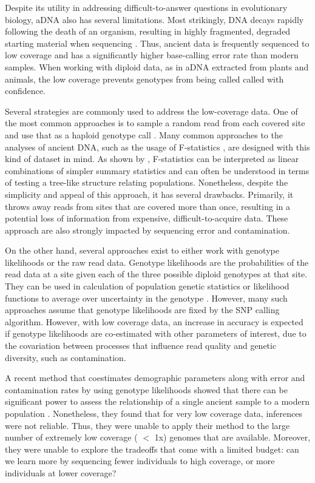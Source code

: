 \documentclass[11pt, oneside]{article}   	%
\begin{document}
Despite its utility in addressing difficult-to-answer questions in evolutionary biology, aDNA also has several limitations. Most strikingly, DNA decays rapidly following the death of an organism, resulting in highly fragmented, degraded starting material when sequencing \citep{sawyer2012temporal}. Thus, ancient data is frequently sequenced to low coverage and has a significantly higher base-calling error rate than modern samples. When working with diploid data, as in aDNA extracted from plants and animals, the low coverage prevents genotypes from being called called with confidence.

Several strategies are commonly used to address the low-coverage data. One of the most common approaches is to sample a random read from each covered site and use that as a haploid genotype call \citep{haak2015massive, mathieson2015genome, allentoft2015population, fu2016genetic, lazaridis2016genomic}. Many common approaches to the analyses of ancient DNA, such as the usage of F-statistics \citep{patterson2012ancient}, are designed with this kind of dataset in mind. As shown by \citet{peter2016admixture}, F-statistics can be interpreted as linear combinations of simpler summary statistics and can often be understood in terms of testing a tree-like structure relating populations. Nonetheless, despite the simplicity and appeal of this approach, it has several drawbacks. Primarily, it throws away reads from sites that are covered more than once, resulting in a potential loss of information from expensive, difficult-to-acquire data. These approach are also strongly impacted by sequencing error and contamination.

On the other hand, several approaches exist to either work with genotype likelihoods or the raw read data. Genotype likelihoods are the probabilities of the read data at a site given each of the three possible diploid genotypes at that site. They can be used in calculation of population genetic statistics or likelihood functions to average over uncertainty in the genotype \citep{korneliussen2014angsd}. However, many such approaches assume that genotype likelihoods are fixed by the SNP calling algorithm. However, with low coverage data, an increase in accuracy is expected if genotype likelihoods are co-estimated with other parameters of interest, due to the covariation between processes that influence read quality and genetic diversity, such as contamination.

A recent method that coestimates demographic parameters along with error and contamination rates by using genotype likelihoods showed that there can be significant power to assess the relationship of a single ancient sample to a modern population \citep{racimo2016joint}. Nonetheless, they found that for very low coverage data, inferences were not reliable. Thus, they were unable to apply their method to the large number of extremely low coverage ( $<$ 1x) genomes that are available. Moreover, they were unable to explore the tradeoffs that come with a limited budget: can we learn more by sequencing fewer individuals to high coverage, or more individuals at lower coverage?
\end{document}
